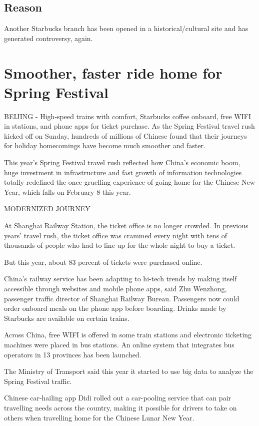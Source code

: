 \subsection{Reason}

Another Starbucks branch has been opened in a historical/cultural site and has
generated controversy, again.

\section{Smoother, faster ride home for Spring Festival}

\begin{displayquote}
	BEIJING - High-speed trains with comfort, Starbucks coffee onboard, free WIFI
	in stations, and phone apps for ticket purchase. As the Spring Festival travel
	rush kicked off on Sunday, hundreds of millions of Chinese found that their
	journeys for holiday homecomings have become much smoother and faster.

	This year's Spring Festival travel rush reflected how China's economic boom,
	huge investment in infrastructure and fast growth of information technologies
	totally redefined the once gruelling experience of going home for the Chinese
	New Year, which falls on February 8 this year.

	MODERNIZED JOURNEY

	At Shanghai Railway Station, the ticket office is no longer crowded. In
	previous years' travel rush, the ticket office was crammed every night with
	tens of thousands of people who had to line up for the whole night to buy a
	ticket.

	But this year, about 83 percent of tickets were purchased online.

	China's railway service has been adapting to hi-tech trends by making itself
	accessible through websites and mobile phone apps, said Zhu Wenzhong, passenger
	traffic director of Shanghai Railway Bureau. Passengers now could order onboard
	meals on the phone app before boarding. Drinks made by Starbucks are available
	on certain trains.

	Across China, free WIFI is offered in some train stations and electronic
	ticketing machines were placed in bus stations. An online system that
	integrates bus operators in 13 provinces has been launched.

	The Ministry of Transport said this year it started to use big data to analyze
	the Spring Festival traffic.

	Chinese car-hailing app Didi rolled out a car-pooling service that can pair
	travelling needs across the country, making it possible for drivers to take on
	others when travelling home for the Chinese Lunar New Year.


\end{displayquote}
